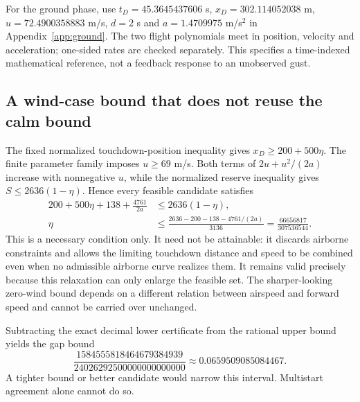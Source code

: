 

For the ground phase, use $t_D=45.3645437606$ s, $x_D=302.114052038$ m, $u=72.4900358883$ m/s, $d=2$ s and $a=1.4709975$ m/s$^2$ in Appendix~\ref{app:ground}. The two flight polynomials meet in position, velocity and acceleration; one-sided rates are checked separately. This specifies a time-indexed mathematical reference, not a feedback response to an unobserved gust.

\subsection{A wind-case bound that does not reuse the calm bound}
The fixed normalized touchdown-position inequality gives $x_D\geq200+500\eta$. The finite parameter family imposes $u\geq69$ m/s. Both terms of $2u+u^2/(2a)$ increase with nonnegative $u$, while the normalized reserve inequality gives $S\leq2636(1-\eta)$. Hence every feasible candidate satisfies
\begin{align}
200+500\eta+138+\frac{4761}{2a}&\leq2636(1-\eta),\\
\eta&\leq\frac{2636-200-138-4761/(2a)}{3136}
=\frac{66656817}{307536544}.
\end{align}
This is a necessary condition only. It need not be attainable: it discards airborne constraints and allows the limiting touchdown distance and speed to be combined even when no admissible airborne curve realizes them. It remains valid precisely because this relaxation can only enlarge the feasible set. The sharper-looking zero-wind bound depends on a different relation between airspeed and forward speed and cannot be carried over unchanged.

Subtracting the exact decimal lower certificate from the rational upper bound yields the gap bound
\begin{equation}
\frac{1584555818464679384939}{24026292500000000000000}
\approx0.0659509085084467.
\end{equation}
A tighter bound or better candidate would narrow this interval. Multistart agreement alone cannot do so.
